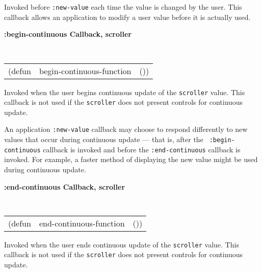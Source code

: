 \begin{flushright} \parbox[t]{6.125in}{
Invoked before {\tt :new-value} each time the value is changed by the user. This
callback allows an application to modify a user value before it is actually
used. 

}\end{flushright}

{\samepage
{\large {\bf :begin-continuous \hfill Callback, scroller}} 
\begin{flushright} 
\parbox[t]{6.125in}{
\tt
\begin{tabular}{lll}
\raggedright
(defun & begin-continuous-function & ())
\end{tabular}
\rm

}\end{flushright}}

\begin{flushright} \parbox[t]{6.125in}{
Invoked when the user begins continuous update of the {\tt scroller} value. This
callback is not used if the {\tt scroller} does not present controls for
continuous update. 

An application {\tt :new-value} callback may choose to respond differently to new
values that occur during continuous update --- that is, after the {\tt
:begin-continuous} callback is invoked and before the {\tt :end-continuous}
callback is invoked. For example, a faster method of displaying the new value
might be used during continuous update.

}\end{flushright}


{\samepage
{\large {\bf :end-continuous \hfill Callback, scroller}} 
\begin{flushright} 
\parbox[t]{6.125in}{
\tt
\begin{tabular}{lll}
\raggedright
(defun & end-continuous-function & ())
\end{tabular}
\rm

}\end{flushright}}

\begin{flushright} \parbox[t]{6.125in}{
Invoked when the user ends continuous update of the {\tt scroller} value. This
callback is not used if the {\tt scroller} does not present controls for
continuous update.

}\end{flushright}








